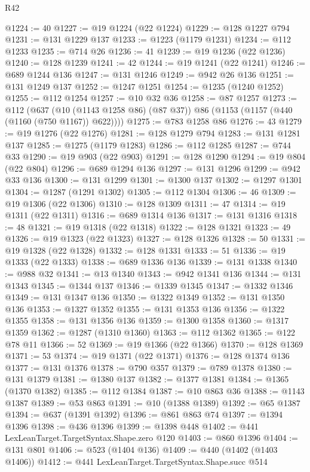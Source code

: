 \begin{lexlean}{R42}
\begin{coremodule}
@1224 := 40
@1227 := @19 @1224 (@22 @1224)
@1229 := @128 @1227 @794
@1231 := @131 @1229 @137
@1233 := @1223 (@1179 @1231)
@1234 := @112 @1233
@1235 := @714 @26
@1236 := 41
@1239 := @19 @1236 (@22 @1236)
@1240 := @128 @1239
@1241 := 42
@1244 := @19 @1241 (@22 @1241)
@1246 := @689 @1244 @136
@1247 := @131 @1246
@1249 := @942 @26 @136
@1251 := @131 @1249 @137
@1252 := @1247 @1251
@1254 := @1235 (@1240 @1252)
@1255 := @112 @1254
@1257 := @10 @32 @36
@1258 := @87 @1257
@1273 := @112
    (@637 (@10 (@1143 @1258 @86) (@87 @37)) @86 (@1153 (@1157 (@440 (@1160 (@750 @1167)) @622))))
@1275 := @783 @1258 @86
@1276 := 43
@1279 := @19 @1276 (@22 @1276)
@1281 := @128 @1279 @794
@1283 := @131 @1281 @137
@1285 := @1275 (@1179 @1283)
@1286 := @112 @1285
@1287 := @744 @33
@1290 := @19 @903 (@22 @903)
@1291 := @128 @1290
@1294 := @19 @804 (@22 @804)
@1296 := @689 @1294 @136
@1297 := @131 @1296
@1299 := @942 @33 @136
@1300 := @131 @1299
@1301 := @1300 @137
@1302 := @1297 @1301
@1304 := @1287 (@1291 @1302)
@1305 := @112 @1304
@1306 := 46
@1309 := @19 @1306 (@22 @1306)
@1310 := @128 @1309
@1311 := 47
@1314 := @19 @1311 (@22 @1311)
@1316 := @689 @1314 @136
@1317 := @131 @1316
@1318 := 48
@1321 := @19 @1318 (@22 @1318)
@1322 := @128 @1321
@1323 := 49
@1326 := @19 @1323 (@22 @1323)
@1327 := @128 @1326
@1328 := 50
@1331 := @19 @1328 (@22 @1328)
@1332 := @128 @1331
@1333 := 51
@1336 := @19 @1333 (@22 @1333)
@1338 := @689 @1336 @136
@1339 := @131 @1338
@1340 := @988 @32
@1341 := @13 @1340
@1343 := @942 @1341 @136
@1344 := @131 @1343
@1345 := @1344 @137
@1346 := @1339 @1345
@1347 := @1332 @1346
@1349 := @131 @1347 @136
@1350 := @1322 @1349
@1352 := @131 @1350 @136
@1353 := @1327 @1352
@1355 := @131 @1353 @136
@1356 := @1322 @1355
@1358 := @131 @1356 @136
@1359 := @1300 @1358
@1360 := @1317 @1359
@1362 := @1287 (@1310 @1360)
@1363 := @112 @1362
@1365 := @122 @78 @11
@1366 := 52
@1369 := @19 @1366 (@22 @1366)
@1370 := @128 @1369
@1371 := 53
@1374 := @19 @1371 (@22 @1371)
@1376 := @128 @1374 @136
@1377 := @131 @1376
@1378 := @790 @357
@1379 := @789 @1378
@1380 := @131 @1379
@1381 := @1380 @137
@1382 := @1377 @1381
@1384 := @1365 (@1370 @1382)
@1385 := @112 @1384
@1387 := @10 @863 @36
@1388 := @1143 @1387
@1389 := @53 @863
@1391 := @10 (@1388 @1389)
@1392 := @65 @1387
@1394 := @637 (@1391 @1392)
@1396 := @861 @863 @74
@1397 := @1394 @1396
@1398 := @436 @1396
@1399 := @1398 @448
@1402 := @441 LexLeanTarget.TargetSyntax.Shape.zero @120
@1403 := @860 @1396
@1404 := @131 @801
@1406 := @523 (@1404 @136)
@1409 := @440 (@1402 (@1403 @1406))
@1412 := @441 LexLeanTarget.TargetSyntax.Shape.succ @514

\end{coremodule}
\end{lexlean}
